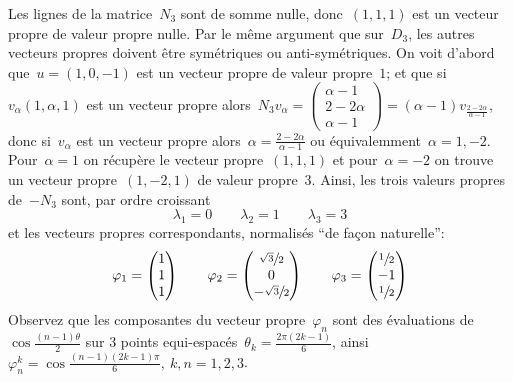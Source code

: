 Les lignes de la matrice~$N_3$ sont de somme nulle, donc~$(1,1,1)$ est un
vecteur propre de valeur propre nulle.  Par le même argument que sur~$D_3$, les
autres vecteurs propres doivent être symétriques ou anti-symétriques.  On voit
d'abord que~$u=(1,0,-1)$ est un vecteur propre de valeur propre~$1$; et que
si~$v_\alpha(1,\alpha,1)$ est un vecteur propre alors~$N_3v_\alpha=
\left(\begin{smallmatrix}\alpha-1\\2-2\alpha\\\alpha-1\end{smallmatrix}\right)=(\alpha-1)v_{\frac{2-2\alpha}{\alpha-1}}$,
donc si~$v_\alpha$ est un vecteur propre
alors~$\alpha=\frac{2-2\alpha}{\alpha-1}$ ou équivalemment~$\alpha=1,-2$.
Pour~$\alpha=1$ on récupère le vecteur propre~$(1,1,1)$ et pour~$\alpha=-2$ on
trouve un vecteur propre~$(1,-2,1)$ de valeur propre~$3$.
Ainsi, les trois valeurs
propres de~$-N_3$ sont, par ordre croissant
\[
	\lambda_1 = 0
	\qquad
	\lambda_2 = 1
	\qquad
	\lambda_3 = 3
\]
et les vecteurs propres correspondants, normalisés ``de façon naturelle'':
\[
	\varphi_1=\begin{pmatrix}
		1\\
		1\\
		1
	\end{pmatrix}
	\qquad
	\varphi_2=\begin{pmatrix}
		\sfrac{\sqrt3}2\\
		0\\
		-\sfrac{\sqrt3}2
	\end{pmatrix}
	\qquad
	\varphi_3=\begin{pmatrix}
		\sfrac12\\
		-1\\
		\sfrac12\\
	\end{pmatrix}
\]
Observez que les composantes du vecteur propre~$\varphi_n$ sont des évaluations
de~$\cos\tfrac{(n-1)\theta}2$ sur 3 points
equi-espacés~$\theta_k=\tfrac{2\pi(2k-1)}6$,
ainsi~$\varphi_n^k=\cos\frac{(n-1)(2k-1)\pi}6,\ k,\!n=1,2,3$.

